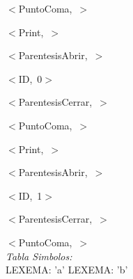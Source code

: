 \documentclass[a4paper, 12pt]{article}
\begin{document}
 
 \mbox{$<$PuntoComa, $>$ }
 
 
 \mbox{$<$Print, $>$ }
 
 
 \mbox{$<$ParentesisAbrir, $>$ }
 
 
 \mbox{$<$ID, 0$>$ }
 
 
 \mbox{$<$ParentesisCerrar, $>$ }
 
 
 \mbox{$<$PuntoComa, $>$ }
 
 
 \mbox{$<$Print, $>$ }
 
 
 \mbox{$<$ParentesisAbrir, $>$ }
 
 
 \mbox{$<$ID, 1$>$ }
 
 
 \mbox{$<$ParentesisCerrar, $>$ }
 
 
 \mbox{$<$PuntoComa, $>$}\medskip\\
\emph{Tabla Simbolos:}\\ 
  LEXEMA: 'a'
  LEXEMA: 'b' 
\end{document}
